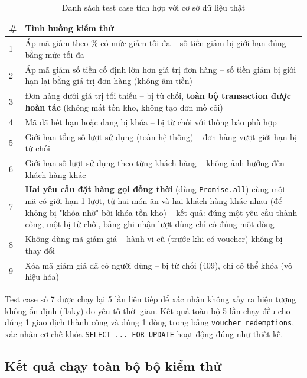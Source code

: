 \documentclass[12pt,a4paper]{article}
\begin{document}
\begin{table}[H]
\centering
\begin{tabular}{@{}p{0.6cm}p{11.2cm}@{}}
\toprule
\textbf{\#} & \textbf{Tình huống kiểm thử} \\
\midrule
1 & Áp mã giảm theo \% có mức giảm tối đa -- số tiền giảm bị giới hạn đúng bằng mức tối đa \\
2 & Áp mã giảm số tiền cố định lớn hơn giá trị đơn hàng -- số tiền giảm bị giới hạn lại bằng giá trị đơn hàng (không âm tiền) \\
3 & Đơn hàng dưới giá trị tối thiểu -- bị từ chối, \textbf{toàn bộ transaction được hoàn tác} (không mất tồn kho, không tạo đơn mồ côi) \\
4 & Mã đã hết hạn hoặc đang bị khóa -- bị từ chối với thông báo phù hợp \\
5 & Giới hạn tổng số lượt sử dụng (toàn hệ thống) -- đơn hàng vượt giới hạn bị từ chối \\
6 & Giới hạn số lượt sử dụng theo từng khách hàng -- không ảnh hưởng đến khách hàng khác \\
7 & \textbf{Hai yêu cầu đặt hàng gọi đồng thời} (dùng \texttt{Promise.all}) cùng một mã có giới hạn 1 lượt, từ hai món ăn và hai khách hàng khác nhau (để không bị "khóa nhờ" bởi khóa tồn kho) -- kết quả: đúng một yêu cầu thành công, một bị từ chối, bảng ghi nhận lượt dùng chỉ có đúng một dòng \\
8 & Không dùng mã giảm giá -- hành vi cũ (trước khi có voucher) không bị thay đổi \\
9 & Xóa mã giảm giá đã có người dùng -- bị từ chối (409), chỉ có thể khóa (vô hiệu hóa) \\
\bottomrule
\end{tabular}
\caption{Danh sách test case tích hợp với cơ sở dữ liệu thật}
\label{tab:testcases}
\end{table}

Test case số 7 được chạy lại 5 lần liên tiếp để xác nhận không xảy ra hiện tượng không ổn định (flaky) do yếu tố thời gian. Kết quả toàn bộ 5 lần chạy đều cho đúng 1 giao dịch thành công và đúng 1 dòng trong bảng \texttt{voucher\_redemptions}, xác nhận cơ chế khóa \texttt{SELECT ... FOR UPDATE} hoạt động đúng như thiết kế.

\subsection{Kết quả chạy toàn bộ bộ kiểm thử}
\end{document}
